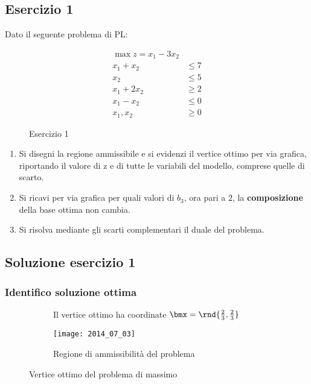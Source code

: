 \documentclass[\main/main.tex]{subfiles}
\begin{document}
\subsection{Esercizio 1}
Dato il seguente problema di PL:

\begin{figure}
  \begin{align*}
    \max z = x_1 -3x_2  \\
    x_1 + x_2  & \leq 7 \\
    x_2        & \leq 5 \\
    x_1 + 2x_2 & \geq 2 \\
    x_1 - x_2  & \leq 0 \\
    x_1, x_2   & \geq 0
  \end{align*}
  \caption{Esercizio 1}
\end{figure}

\begin{enumerate}
  \item Si disegni la regione ammissibile e si evidenzi il vertice ottimo per via grafica, riportando il valore di z e di tutte le variabili del modello, comprese quelle di scarto.
  \item Si ricavi per via grafica per quali valori di $b_3$, ora pari a $2$, la \textbf{composizione} della base ottima non cambia.
  \item Si risolva mediante gli scarti complementari il duale del problema.
\end{enumerate}

\subsection{Soluzione esercizio 1}

\subsubsection*{Identifico soluzione ottima}

\begin{figure}
  \begin{subfigure}{0.49\textwidth}
    \caption{Il vertice ottimo ha coordinate $\bmx = \rnd{\frac{2}{3},\frac{2}{3}}$}
  \end{subfigure}
  \begin{subfigure}{0.49\textwidth}
    \texttt{[image: 2014\_07\_03]}
    \caption{Regione di ammissibilità del problema}
  \end{subfigure}
  \caption{Vertice ottimo del problema di massimo}
\end{figure}
\end{document}
